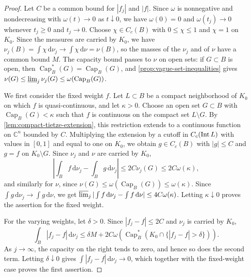 \begin{proof}
Let $C$ be a common bound for $|f_j|$ and $|f|$. Since $\omega$ is nonnegative and nondecreasing with $\omega(t)\to0$ as $t\downarrow0$, we have $\omega(0)=0$ and $\omega(t_j)\to0$ whenever $t_j\geq0$ and $t_j\to0$. Choose $\chi\in C_c(B)$ with $0\leq\chi\leq1$ and $\chi=1$ on $K_0$. Since the measures are carried by $K_0$, we have $\nu_j(B)=\int\chi\,\mathrm d\nu_j\to\int\chi\,\mathrm d\nu=\nu(B)$, so the masses of the $\nu_j$ and of $\nu$ have a common bound $M$. The capacity bound passes to $\nu$ on open sets: if $G\subset B$ is open, then $\operatorname{Cap}^*_B(G)=\operatorname{Cap}_B(G)$, and \cref{prop:vague-set-inequalities} gives $\nu(G)\leq\varliminf_j\nu_j(G)\leq\omega(\operatorname{Cap}_B(G))$.

We first consider the fixed weight $f$. Let $L\subset B$ be a compact neighborhood of $K_0$ on which $f$ is quasi-continuous, and let $\kappa>0$. Choose an open set $G\subset B$ with $\operatorname{Cap}_B(G)<\kappa$ such that $f$ is continuous on the compact set $L\setminus G$. By \cref{lem:compact-tietze-extension}, this restriction extends to a continuous function on $\mathbb C^n$ bounded by $C$. Multiplying the extension by a cutoff in $C_c(\operatorname{Int} L)$ with values in $[0,1]$ and equal to one on $K_0$, we obtain $g\in C_c(B)$ with $|g|\leq C$ and $g=f$ on $K_0\setminus G$. Since $\nu_j$ and $\nu$ are carried by $K_0$,
\[
 \left|\int_Bf\,\mathrm d\nu_j-\int_Bg\,\mathrm d\nu_j\right|\leq2C\nu_j(G)\leq2C\omega(\kappa),
\]
and similarly for $\nu$, since $\nu(G)\leq\omega(\operatorname{Cap}_B(G))\leq\omega(\kappa)$. Since $\int g\,\mathrm d\nu_j\to\int g\,\mathrm d\nu$, we get $\varlimsup_j|\int f\,\mathrm d\nu_j-\int f\,\mathrm d\nu|\leq4C\omega(\kappa)$. Letting $\kappa\downarrow0$ proves the assertion for the fixed weight.

For the varying weights, let $\delta>0$. Since $|f_j-f|\leq2C$ and $\nu_j$ is carried by $K_0$,
\[
 \int_B|f_j-f|\,\mathrm d\nu_j
 \leq\delta M+2C\omega\left(
       \operatorname{Cap}_B^*(K_0\cap\{|f_j-f|>\delta\})\right).
\]
As $j\to\infty$, the capacity on the right tends to zero, and hence so does the second term. Letting $\delta\downarrow0$ gives $\int|f_j-f|\,\mathrm d\nu_j\to0$, which together with the fixed-weight case proves the first assertion.


\end{proof}
